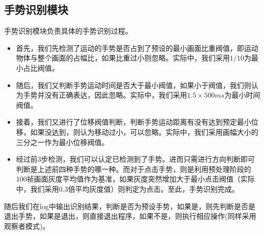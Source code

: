 \documentclass{XDBAthesis}
\begin{document}
\subsection{手势识别模块}
手势识别模块负责具体的手势识别过程。
\begin{itemize}
    \item 首先，我们先检测了运动的手势是否占到了预设的最小画面比重阀值，即运动物体与整个画面的占幅比，如果比重过小则忽略。实际中，我们采用$1/10$为最小占比阀值。
    \item 随后，我们又判断手势运动时间是否大于最小阀值，如果小于阀值，我们则认为手势并没有正确表达，因此忽略。实际中，我们采用$1.5\times 500ms$为最小时间阀值。
    \item 接着，我们又进行了位移阀值判断，判断手势运动距离有没有达到预定最小位移，如果没达到，则认为移动过小，可以忽略。实际中，我们采用画幅大小的三分之一作为最小位移阀值。
    \item 经过前3步检测，我们可以认定已检测到了手势。进而只需进行方向判断即可判断是上述前四种手势的哪一种。而对于点击手势，则是利用预处理阶段的100祯画面灰度平均值作为基准，如果灰度突然增加大于最小点击阀值（实际中，我们采用0.3倍平均灰度值）则判定为点击。至此，手势识别完成。
\end{itemize}

随后我们在log中输出识别结果，判断是否为预设手势，如果是，则先判断是否是退出手势，如果是退出，则直接退出程序，如果不是，则执行相应操作(同样采用观察者模式)。
\end{document}
